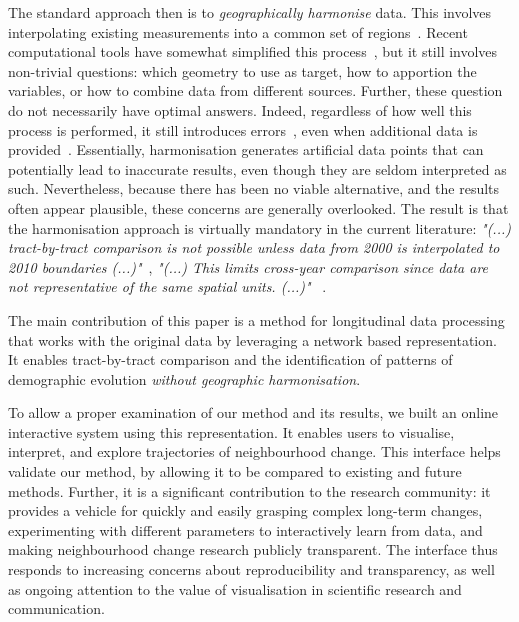 The standard approach then is to \emph{geographically harmonise} data. This
involves interpolating existing measurements into a common set of
regions~\citep{Logan2014,Hallisey2017,Allen2018}. Recent computational tools
have somewhat simplified this process~\citep{rey2018spatio}, but it still
involves non-trivial questions: which geometry to use as target, how to
apportion the variables, or how to combine data from different sources. Further,
these question do not necessarily have optimal answers. Indeed, regardless of
how well this process is performed, it still introduces
errors~\citep{Logan2016}, even when additional data is
provided~\citep{eicher2001dasymetric}. Essentially, harmonisation generates
artificial data points that can potentially lead to inaccurate results, even
though they are seldom interpreted as such. Nevertheless, because there has been
no viable alternative, and the results often appear plausible, these concerns
are generally overlooked. The result is that the harmonisation approach is
virtually mandatory in the current literature: \emph{"(...) tract-by-tract
comparison is not possible unless data from 2000 is interpolated to 2010
boundaries (...)"}~\citep{Dmowska2017}, \emph{"(...) This limits cross-year
comparison since data are not representative of the same spatial units. (...)"}
~\citep{Allen2018}. 


The main contribution of this paper is a method for longitudinal data processing
that works with the original data by leveraging a network based representation.
It enables tract-by-tract comparison and the identification of patterns of
demographic evolution \emph{without geographic harmonisation}. 

To allow a proper examination of our method and its results, we built an online
interactive system using this representation. It enables users to visualise,
interpret, and explore trajectories of neighbourhood change. This interface
helps validate our method, by allowing it to be compared to existing and future
methods. Further, it is a significant contribution to the research community: it
provides a vehicle for quickly and easily grasping complex long-term changes,
experimenting with different parameters to interactively learn from data, and
making neighbourhood change research publicly transparent. The interface thus
responds to increasing concerns about reproducibility and transparency, as well
as ongoing attention to the value of visualisation in scientific research and
communication.


